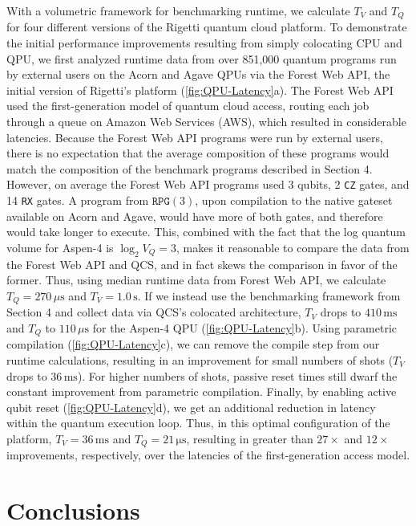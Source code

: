 \documentclass[12pt]{iopart}
\begin{document}
With a volumetric framework for benchmarking runtime, we calculate $T_V$ and $T_Q$ for four different versions of the Rigetti quantum cloud platform. To demonstrate the initial performance improvements resulting from simply colocating CPU and QPU, we first analyzed runtime data from over 851,000 quantum programs run by external users on the Acorn and Agave QPUs via the Forest Web API, the initial version of Rigetti's platform (\cref{fig:QPU-Latency}a). The Forest Web API used the first-generation model of quantum cloud access, routing each job through a queue on Amazon Web Services (AWS), which resulted in considerable latencies. Because the Forest Web API programs were run by external users, there is no expectation that the average composition of these programs would match the composition of the benchmark programs described in Section 4. However, on average the Forest Web API programs used 3 qubits, 2 \texttt{CZ} gates, and 14 \texttt{RX} gates. A program from $\texttt{RPG}(3)$, upon compilation to the native gateset available on Acorn and Agave, would have more of both gates, and therefore would take longer to execute. This, combined with the fact that the log quantum volume for Aspen-4 is $\log_{2}{V_Q} = 3$, makes it reasonable to compare the data from the Forest Web API and QCS, and in fact skews the comparison in favor of the former. Thus, using median runtime data from Forest Web API, we calculate $T_Q = 270\,\mu\mathrm{s}$ and $T_V = 1.0\,\mathrm{s}$. If we instead use the benchmarking framework from Section 4 and collect data via QCS's colocated architecture, $T_V$ drops to $410\,\mathrm{ms}$ and $T_Q$ to $110\,\mu\mathrm{s}$ for the Aspen-4 QPU (\cref{fig:QPU-Latency}b). Using parametric compilation (\cref{fig:QPU-Latency}c), we can remove the compile step from our runtime calculations, resulting in an improvement for small numbers of shots ($T_V$ drops to $36\,\mathrm{ms}$). For higher numbers of shots, passive reset times still dwarf the constant improvement from parametric compilation. Finally, by enabling active qubit reset (\cref{fig:QPU-Latency}d), we get an additional reduction in latency within the quantum execution loop. Thus, in this optimal configuration of the platform, $T_V = 36\,\mathrm{ms}$ and $T_Q = 21\,\mathrm{\mu}\mathrm{s}$, resulting in greater than $27\times$ and $12\times$ improvements, respectively, over the latencies of the first-generation access model.

\section{Conclusions}
\end{document}
